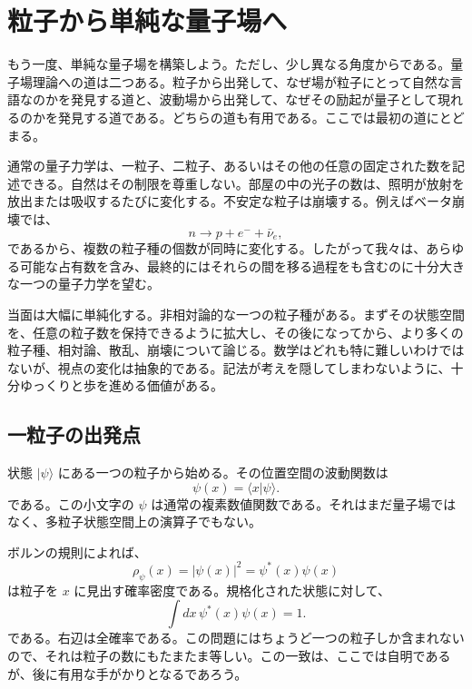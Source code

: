 \chapter{粒子から単純な量子場へ}

もう一度、単純な量子場を構築しよう。ただし、少し異なる角度からである。量子場理論への道は二つある。粒子から出発して、なぜ場が粒子にとって自然な言語なのかを発見する道と、波動場から出発して、なぜその励起が量子として現れるのかを発見する道である。どちらの道も有用である。ここでは最初の道にとどまる。

通常の量子力学は、一粒子、二粒子、あるいはその他の任意の固定された数を記述できる。自然はその制限を尊重しない。部屋の中の光子の数は、照明が放射を放出または吸収するたびに変化する。不安定な粒子は崩壊する。例えばベータ崩壊では、
\begin{equation}
n\longrightarrow p+e^-+\bar{\nu}_e,
\end{equation}
であるから、複数の粒子種の個数が同時に変化する。したがって我々は、あらゆる可能な占有数を含み、最終的にはそれらの間を移る過程をも含むのに十分大きな一つの量子力学を望む。

当面は大幅に単純化する。非相対論的な一つの粒子種がある。まずその状態空間を、任意の粒子数を保持できるように拡大し、その後になってから、より多くの粒子種、相対論、散乱、崩壊について論じる。数学はどれも特に難しいわけではないが、視点の変化は抽象的である。記法が考えを隠してしまわないように、十分ゆっくりと歩を進める価値がある。

\section{一粒子の出発点}

状態 \(|\psi\rangle\) にある一つの粒子から始める。その位置空間の波動関数は
\begin{equation}
\psi(x)=\langle x|\psi\rangle.
\label{eq:l07-wavefunction}
\end{equation}
である。この小文字の \(\psi\) は通常の複素数値関数である。それはまだ量子場ではなく、多粒子状態空間上の演算子でもない。

ボルンの規則によれば、
\begin{equation}
\rho_\psi(x)=|\psi(x)|^2=\psi^*(x)\psi(x)
\label{eq:l07-born-density}
\end{equation}
は粒子を \(x\) に見出す確率密度である。規格化された状態に対して、
\begin{equation}
\int dx\,\psi^*(x)\psi(x)=1.
\label{eq:l07-one-particle-normalization}
\end{equation}
である。右辺は全確率である。この問題にはちょうど一つの粒子しか含まれないので、それは粒子の数にもたまたま等しい。この一致は、ここでは自明であるが、後に有用な手がかりとなるであろう。

